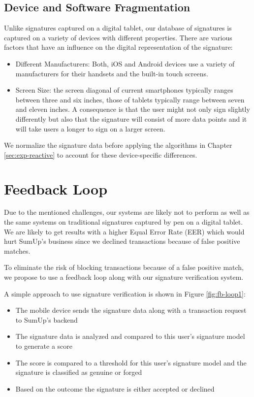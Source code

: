 \documentclass[a4paper, oneside]{csthesis}
\begin{document}
\subsection{Device and Software Fragmentation}

Unlike signatures captured on a digital tablet, our database of signatures is captured on a variety of devices with different properties. There are various factors that have an influence on the digital representation of the signature:

\begin{itemize}
\item Different Manufacturers: Both, iOS and Android devices use a variety of manufacturers for their handsets and the built-in touch screens.
\item Screen Size: the screen diagonal of current smartphones typically ranges between three and six inches, those of tablets typically range between seven and eleven inches. A consequence is that the user might not only sign slightly differently but also that the signature will consist of more data points and it will take users a longer to sign on a larger screen.
\end{itemize}

We normalize the signature data before applying the algorithms in Chapter \ref{sec:exp-reactive} to account for these device-specific differences.






\section{Feedback Loop}

Due to the mentioned challenges, our systems are likely not to perform as well as the same systems on traditional signatures captured by pen on a digital tablet. We are likely to get results with a higher Equal Error Rate (EER) which would hurt SumUp's business since we declined transactions because of false positive matches.

To eliminate the risk of blocking transactions because of a false positive match, we propose to use a feedback loop along with our signature verification system.

A simple approach to use signature verification is shown in Figure \ref{fig:fb-loop1}:
\begin{itemize}
\item The mobile device sends the signature data along with a transaction request to SumUp's backend
\item The signature data is analyzed and compared to this user's signature model to generate a score
\item The score is compared to a threshold for this user's signature model and the signature is classified as genuine or forged
\item Based on the outcome the signature is either accepted or declined
\end{itemize}
\end{document}
